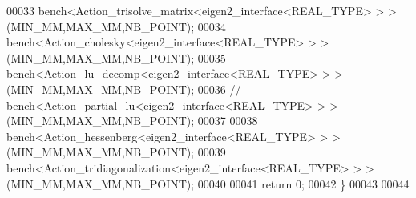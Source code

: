 \begin{DoxyCode}
00033   bench<Action\_trisolve\_matrix<eigen2\_interface<REAL\_TYPE> > >(MIN\_MM,MAX\_MM,NB\_POINT);
00034   bench<Action\_cholesky<eigen2\_interface<REAL\_TYPE> > >(MIN\_MM,MAX\_MM,NB\_POINT);
00035   bench<Action\_lu\_decomp<eigen2\_interface<REAL\_TYPE> > >(MIN\_MM,MAX\_MM,NB\_POINT);
00036 \textcolor{comment}{//   bench<Action\_partial\_lu<eigen2\_interface<REAL\_TYPE> > >(MIN\_MM,MAX\_MM,NB\_POINT);}
00037 
00038   bench<Action\_hessenberg<eigen2\_interface<REAL\_TYPE> > >(MIN\_MM,MAX\_MM,NB\_POINT);
00039   bench<Action\_tridiagonalization<eigen2\_interface<REAL\_TYPE> > >(MIN\_MM,MAX\_MM,NB\_POINT);
00040 
00041   \textcolor{keywordflow}{return} 0;
00042 \}
00043 
00044 
\end{DoxyCode}
